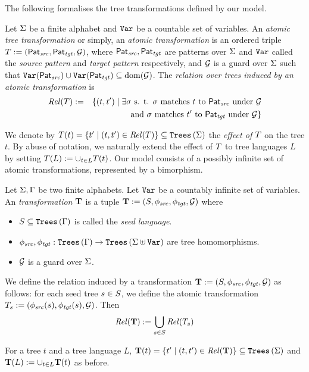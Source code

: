 The following formalises the tree transformations defined by our model.
\begin{definition}\label{def:atomicAction}
    Let $\Sigma$ be a finite alphabet and $\texttt{Var}$ be a countable set of variables. An \emph{atomic tree transformation} or simply, an \emph{atomic transformation} is an ordered triple $T := (\mathsf{Pat}_{\mathit{src}}, \mathsf{Pat}_{\mathit{tgt}}, \mathcal{G})$, where $\mathsf{Pat}_{\mathit{src}}, \mathsf{Pat}_{\mathit{tgt}}$ are patterns over $\Sigma$ and $\texttt{Var}$ called the \emph{source pattern} and \emph{target pattern} respectively, and $\mathcal{G}$ is a guard over $\Sigma$ such that $\texttt{Var}(\mathsf{Pat}_{\mathit{src}}) \cup \texttt{Var}(\mathsf{Pat}_{\mathit{tgt}}) \subseteq \operatorname{dom}(\mathcal{G})$. The \emph{relation over trees induced by an atomic transformation} is
    \begin{eqnarray*}
        \mathit{Rel}(T)
        & := & \{(t,t') \mid \exists \sigma \mbox{ s. t. } \sigma \mbox{ matches } t  \mbox{ to } \mathsf{Pat}_{\mathit{src}} \mbox{ under } \mathcal{G}\\
        &   & \mbox{ and } \sigma \mbox{ matches } t'  \mbox{ to } \mathsf{Pat}_{\mathit{tgt}} \mbox{ under } \mathcal{G} \}
    \end{eqnarray*}
\end{definition}
We denote by $T(t) = \{t' \mid (t,t') \in \mathit{Rel}(T)\}\subseteq \texttt{Trees}\left(\Sigma\right)$ the \emph{effect of $T$} on the tree $t$. By abuse of notation, we naturally extend the effect of $T$ to tree languages $L$ by setting $T(L) := \cup_{t \in L}T(t)$. Our model consists of a possibly infinite set of atomic transformations, represented by a bimorphism.

\begin{definition}[Transformation]\label{def:action}
    Let $\Sigma, \Gamma$ be two finite alphabets. Let $\texttt{Var}$ be a countably infinite set of variables. An \emph{transformation} $\mathbf{T}$ is a tuple $\mathbf{T} := (S, \phi_{\mathit{src}}, \phi_{\mathit{tgt}}, \mathcal{G})$ where
    \begin{itemize}
        \item $S \subseteq \texttt{Trees}\left(\Gamma\right)$ is called the \emph{seed language}.
        \item $\phi_{\mathit{src}}, \phi_{\mathit{tgt}} : \texttt{Trees}\left(\Gamma\right) \to \texttt{Trees}\left(\Sigma \uplus \texttt{Var}\right)$ are tree homomorphisms.
        \item $\mathcal{G}$ is a guard over $\Sigma$.
    \end{itemize}
    We define the relation induced by a transformation $\mathbf{T} := (S, \phi_{\mathit{src}}, \phi_{\mathit{tgt}}, \mathcal{G})$ as follows: for each seed tree $s \in S$, we define the atomic transformation $T_s:= (\phi_{\mathit{src}}(s), \phi_{\mathit{tgt}}(s), \mathcal{G})$. Then
    \[ \mathit{Rel}(\mathbf{T}) := \bigcup_{s \in S}\mathit{Rel}(T_s) \]
\end{definition}
For a tree $t$ and a tree language $L$, $\mathbf{T}(t) = \{t' \mid (t,t') \in \mathit{Rel}(\mathbf{T})\}\subseteq \texttt{Trees}\left(\Sigma\right)$ and $\mathbf{T}(L) := \cup_{t \in L}\mathbf{T}(t)$ as before.
